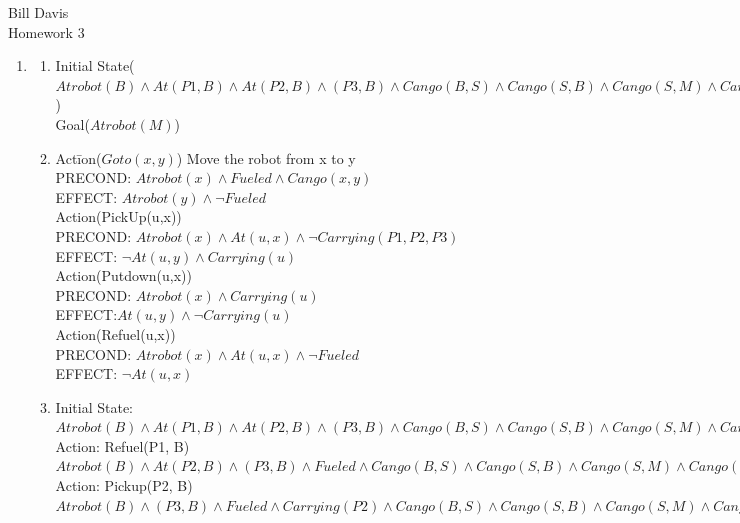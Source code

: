 \documentclass[11pt,fleqn]{article}
\begin{document}
\newcommand{\mbf}[1]{\mbox{{\bfseries #1}}}
\newcommand{\N}{\mbf{N}}
\renewcommand{\O}{\mbf{O}}

\noindent Bill Davis \\
Homework 3

\begin{enumerate}
\item %

\begin{enumerate}
\item %
Initial State($Atrobot(B) \land At(P1, B) \land At(P2, B) \land (P3,B) \land Cango(B,S) \land Cango(S,B) \land Cango(S, M)\land Cango(M,S)$)\\
Goal($Atrobot(M)$)
\item %
\begin{tabbing}
Act\=ion($Goto(x, y)$) Move the robot from x to y\\
\>PRECOND: $Atrobot(x) \land Fueled \land Cango(x,y)$\\
\>EFFECT: $Atrobot(y) \land \lnot Fueled$ \\
Action(PickUp(u,x))\\
\>PRECOND: $Atrobot(x) \land At(u,x) \land \lnot Carrying(P1,P2,P3) $ \\
\>EFFECT: $\lnot At(u,y) \land Carrying(u) $\\
Action(Putdown(u,x))\\
\>PRECOND: $Atrobot(x) \land Carrying(u) $ \\
\>EFFECT:$ At(u,y) \land \lnot Carrying(u) $\\
Action(Refuel(u,x)) \\
\>PRECOND: $Atrobot(x) \land At(u,x) \land \lnot Fueled$\\
\>EFFECT: $\lnot At(u,x)$\\
\end{tabbing}


\item %
Initial State: \\
$Atrobot(B) \land At(P1, B) \land At(P2, B) \land (P3,B) \land Cango(B,S) \land Cango(S,B) \land Cango(S, M)\land Cango(M,S)$ \\

Action: Refuel(P1, B) \\
$Atrobot(B) \land At(P2, B) \land (P3,B) \land Fueled \land Cango(B,S) \land Cango(S,B) \land Cango(S, M) \land Cango(M,S)$ \\

Action: Pickup(P2, B) \\
$Atrobot(B)  \land (P3,B) \land Fueled  \land Carrying(P2) \land Cango(B,S) \land Cango(S,B) \land Cango(S, M)\land Cango(M,S)$ \\


\end{enumerate}
\end{enumerate}
\end{document}
